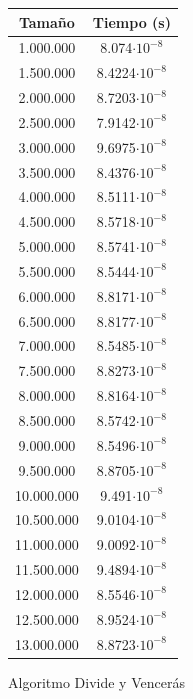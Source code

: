 \documentclass[12pt,spanish]{article}
\begin{document}
\begin{figure}[H]
\begin{tabular}{|c|c|}
\hline
\textbf{Tamaño} & \textbf{Tiempo (s)} \\
\hline
1.000.000 & 8.074$ \cdot 10^{-8} $\\
\hline
1.500.000 & 8.4224$ \cdot 10^{-8} $\\
\hline
2.000.000 & 8.7203$ \cdot 10^{-8} $\\
\hline
2.500.000 & 7.9142$ \cdot 10^{-8} $\\
\hline
3.000.000 & 9.6975$ \cdot 10^{-8} $\\
\hline
3.500.000 & 8.4376$ \cdot 10^{-8} $\\
\hline
4.000.000 & 8.5111$ \cdot 10^{-8} $\\
\hline
4.500.000 & 8.5718$ \cdot 10^{-8} $\\
\hline
5.000.000 & 8.5741$ \cdot 10^{-8} $\\
\hline
5.500.000 & 8.5444$ \cdot 10^{-8} $\\
\hline
6.000.000 & 8.8171$ \cdot 10^{-8} $\\
\hline
6.500.000 & 8.8177$ \cdot 10^{-8} $\\
\hline
7.000.000 & 8.5485$ \cdot 10^{-8} $\\
\hline
7.500.000 & 8.8273$ \cdot 10^{-8} $\\
\hline
8.000.000 & 8.8164$ \cdot 10^{-8} $\\
\hline
8.500.000 & 8.5742$ \cdot 10^{-8} $\\
\hline
9.000.000 & 8.5496$ \cdot 10^{-8} $\\
\hline
9.500.000 & 8.8705$ \cdot 10^{-8} $\\
\hline
10.000.000 & 9.491$ \cdot 10^{-8} $\\
\hline
10.500.000 & 9.0104$ \cdot 10^{-8} $\\
\hline
11.000.000 & 9.0092$ \cdot 10^{-8} $\\
\hline
11.500.000 & 9.4894$ \cdot 10^{-8} $\\
\hline
12.000.000 & 8.5546$ \cdot 10^{-8} $\\
\hline
12.500.000 & 8.9524$ \cdot 10^{-8} $\\
\hline
13.000.000 & 8.8723$ \cdot 10^{-8} $\\
\hline

\hline
\end{tabular}
\label{fig:dyv}
\caption{Algoritmo Divide y Vencerás}
\end{figure}
\end{document}
